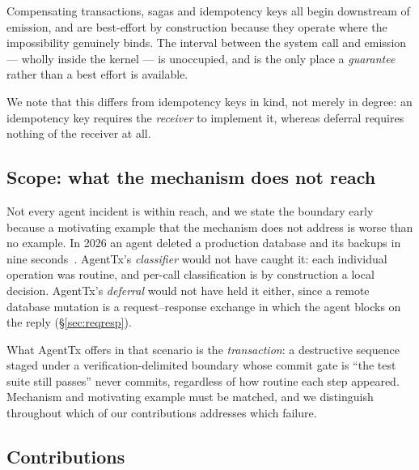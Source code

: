 \documentclass[10pt,twocolumn]{article}
\newcommand{\sys}{AgentTx}
\begin{document}
Compensating transactions, sagas and idempotency keys all begin downstream of
emission, and are best-effort by construction because they operate where the
impossibility genuinely binds. The interval between the system call and emission
--- wholly inside the kernel --- is unoccupied, and is the only place a
\emph{guarantee} rather than a best effort is available.

We note that this differs from idempotency keys in kind, not merely in degree:
an idempotency key requires the \emph{receiver} to implement it, whereas
deferral requires nothing of the receiver at all.

\subsection{Scope: what the mechanism does not reach}
\label{sec:scope}

Not every agent incident is within reach, and we state the boundary early
because a motivating example that the mechanism does not address is worse than
no example. In 2026 an agent deleted a production database and its backups in
nine seconds~\cite{cursorincident}. \sys{}'s \emph{classifier} would not have
caught it: each individual operation was routine, and per-call classification is
by construction a local decision. \sys{}'s \emph{deferral} would not have held
it either, since a remote database mutation is a request--response exchange in
which the agent blocks on the reply (\S\ref{sec:reqresp}).

What \sys{} offers in that scenario is the \emph{transaction}: a destructive
sequence staged under a verification-delimited boundary whose commit gate is
``the test suite still passes'' never commits, regardless of how routine each
step appeared. Mechanism and motivating example must be matched, and we
distinguish throughout which of our contributions addresses which failure.

\subsection{Contributions}
\end{document}
